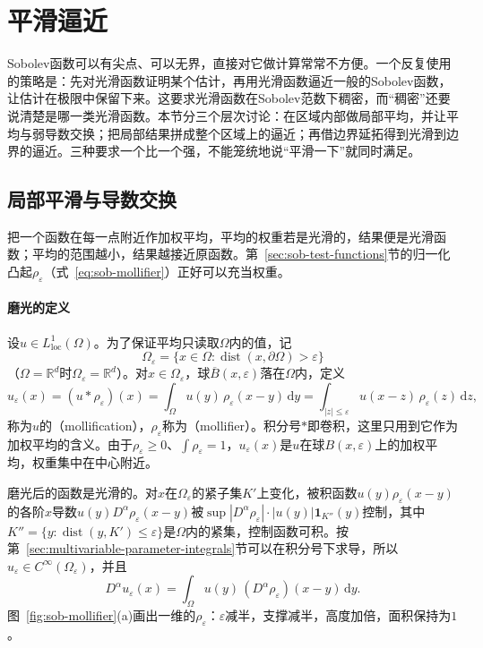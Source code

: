 
\section{平滑逼近}
\label{sec:sob-smoothing}

Sobolev函数可以有尖点、可以无界，直接对它做计算常常不方便。一个反复使用的策略是：先对光滑函数证明某个估计，再用光滑函数逼近一般的Sobolev函数，让估计在极限中保留下来。这要求光滑函数在Sobolev范数下稠密，而“稠密”还要说清楚是哪一类光滑函数。本节分三个层次讨论：在区域内部做局部平均，并让平均与弱导数交换；把局部结果拼成整个区域上的逼近；再借边界延拓得到光滑到边界的逼近。三种要求一个比一个强，不能笼统地说“平滑一下”就同时满足。

\subsection{局部平滑与导数交换}
\label{sec:sob-mollification}

把一个函数在每一点附近作加权平均，平均的权重若是光滑的，结果便是光滑函数；平均的范围越小，结果越接近原函数。第~\ref{sec:sob-test-functions}节的归一化凸起$\rho_\varepsilon$（式~\eqref{eq:sob-mollifier}）正好可以充当权重。

\paragraph{磨光的定义}
设$u\in L^1_{\mathrm{loc}}(\Omega)$。为了保证平均只读取$\Omega$内的值，记
\[
 \Omega_\varepsilon=\{x\in\Omega:\operatorname{dist}(x,\partial\Omega)>\varepsilon\}
\]
（$\Omega=\mathbb R^d$时$\Omega_\varepsilon=\mathbb R^d$）。对$x\in\Omega_\varepsilon$，球$\overline B(x,\varepsilon)$落在$\Omega$内，定义
\begin{equation}
 u_\varepsilon(x)=(u*\rho_\varepsilon)(x)=\int_\Omega u(y)\,\rho_\varepsilon(x-y)\,\mathrm dy=\int_{|z|\le\varepsilon}u(x-z)\,\rho_\varepsilon(z)\,\mathrm dz ,
 \label{eq:sob-mollification}
\end{equation}
称为$u$的（mollification），$\rho_\varepsilon$称为（mollifier）。积分号$*$即卷积，这里只用到它作为加权平均的含义。由于$\rho_\varepsilon\ge0$、$\int\rho_\varepsilon=1$，$u_\varepsilon(x)$是$u$在球$B(x,\varepsilon)$上的加权平均，权重集中在中心附近。

磨光后的函数是光滑的。对$x$在$\Omega_\varepsilon$的紧子集$K'$上变化，被积函数$u(y)\rho_\varepsilon(x-y)$的各阶$x$导数$u(y)D^\alpha\rho_\varepsilon(x-y)$被$\sup|D^\alpha\rho_\varepsilon|\cdot|u(y)|\mathbf 1_{K''}(y)$控制，其中$K''=\{y:\operatorname{dist}(y,K')\le\varepsilon\}$是$\Omega$内的紧集，控制函数可积。按第~\ref{sec:multivariable-parameter-integrals}节可以在积分号下求导，所以$u_\varepsilon\in C^\infty(\Omega_\varepsilon)$，并且
\begin{equation}
 D^\alpha u_\varepsilon(x)=\int_\Omega u(y)\,(D^\alpha\rho_\varepsilon)(x-y)\,\mathrm dy .
 \label{eq:sob-mollifier-derivative}
\end{equation}
图~\ref{fig:sob-mollifier}(a)画出一维的$\rho_\varepsilon$：$\varepsilon$减半，支撑减半，高度加倍，面积保持为$1$。


